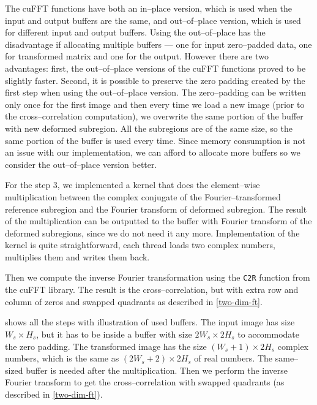 The cuFFT functions have both an in--place version, which is used when the input and output buffers are the same, and out--of--place version, which is used for different input and output buffers. Using the out--of--place has the disadvantage if allocating multiple buffers --- one for input zero--padded data, one for transformed matrix and one for the output. However there are two advantages: first, the out--of--place versions of the cuFFT functions proved to be slightly faster. Second, it is possible to preserve the zero padding created by the first step when using the out--of--place version. The zero--padding can be written only once for the first image and then every time we load a new image (prior to the cross--correlation computation), we overwrite the same portion of the buffer with new deformed subregion. All the subregions are of the same size, so the same portion of the buffer is used every time. Since memory consumption is not an issue with our implementation, we can afford to allocate more buffers so we consider the out--of--place version better.

For the step 3, we implemented a kernel that does the element--wise multiplication between the complex conjugate of the Fourier--transformed reference subregion and the Fourier transform of deformed subregion. The result of the multiplication can be outputted to the buffer with Fourier transform of the deformed subregions, since we do not need it any more. Implementation of the kernel is quite straightforward, each thread loads two complex numbers, multiplies them and writes them back. 



Then we compute the inverse Fourier transformation using the \texttt{C2R} function from the cuFFT library. The result is the cross--correlation, but with extra row and column of zeros and swapped quadrants as described in \cref{two-dim-ft}.

 shows all the steps with illustration of used buffers. The input image has size $W_s \times H_s$, but it has to be inside a buffer with size $2W_s \times 2H_s$ to accommodate the zero padding. The transformed image has the size $(W_s+1) \times 2H_s$ complex numbers, which is the same as  $(2W_s+2) \times 2H_s$ of real numbers. The same--sized buffer is needed after the multiplication. Then we perform the inverse Fourier transform to get the cross--correlation with swapped quadrants (as described in \cref{two-dim-ft}).


